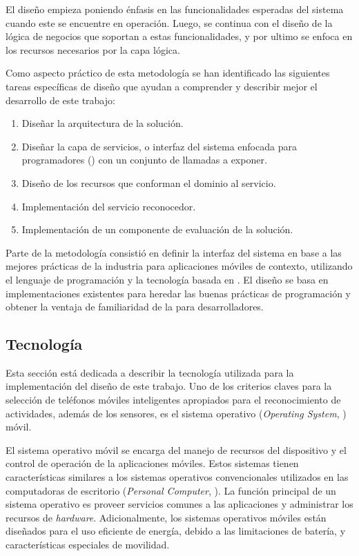 El diseño empieza poniendo énfasis en las funcionalidades esperadas
del sistema cuando este se encuentre en operación. Luego, se continua
con el diseño de la lógica de negocios que soportan a estas funcionalidades,
y por ultimo se enfoca en los recursos necesarios por la capa lógica.

Como aspecto práctico de esta metodología se han identificado las
siguientes tareas específicas de diseño que ayudan a comprender y
describir mejor el desarrollo de este trabajo:
\begin{enumerate}
\item Diseñar la arquitectura de la solución.
\item Diseñar la capa de servicios, o interfaz del sistema enfocada para
programadores () con un conjunto de llamadas a exponer.
\item Diseño de los recursos que conforman el dominio al servicio.
\item Implementación del servicio reconocedor.
\item Implementación de un componente de evaluación de la solución.
\end{enumerate}
Parte de la metodología consistió en definir la interfaz del sistema
en base a las mejores prácticas de la industria para aplicaciones
móviles de contexto, utilizando el lenguaje de programación \emph{}
y la tecnología basada en \emph{}. El diseño se basa
en implementaciones existentes \cite{Google2016m} para heredar las
buenas prácticas de programación y obtener la ventaja de familiaridad
de la  para desarrolladores.

\subsection{Tecnología}

\label{ssec52:tecnologia}Esta sección está dedicada a describir la
tecnología utilizada para la implementación del diseño de este trabajo.
Uno de los criterios claves para la selección de teléfonos móviles
inteligentes apropiados para el reconocimiento de actividades, además
de los sensores, es el sistema operativo (\emph{Operating System},
) móvil. 

El sistema operativo móvil se encarga del manejo de recursos del dispositivo
y el control de operación de la aplicaciones móviles. Estos sistemas
tienen características similares a los sistemas operativos convencionales
utilizados en las computadoras de escritorio (\emph{Personal Computer},
). La función principal de un sistema operativo es proveer
servicios comunes a las aplicaciones y administrar los recursos de
\emph{hardware}. Adicionalmente, los sistemas operativos móviles están
diseñados para el uso eficiente de energía, debido a las limitaciones
de batería, y características especiales de movilidad. 


